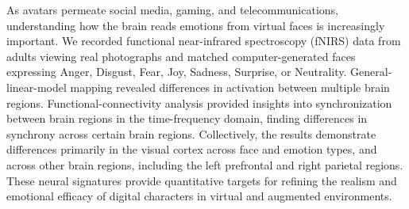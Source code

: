As avatars permeate social media, gaming, and telecommunications, understanding how the brain reads emotions from virtual faces is increasingly important. 
We recorded functional near-infrared spectroscopy (fNIRS) data from adults viewing real photographs and matched computer-generated faces expressing Anger, Disgust, Fear, Joy, Sadness, Surprise, or Neutrality. 
General-linear-model mapping revealed differences in activation between multiple brain regions. 
Functional-connectivity analysis provided insights into synchronization between brain regions in the time-frequency domain, finding differences in synchrony across certain brain regions. 
Collectively, the results demonstrate differences primarily in the visual cortex across face and emotion types, and across other brain regions, including the left prefrontal and right parietal regions. 
These neural signatures provide quantitative targets for refining the realism and emotional efficacy of digital characters in virtual and augmented environments.